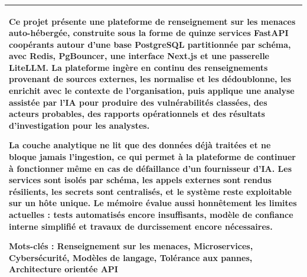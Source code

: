 \documentclass[a4paper,12pt]{report}
\begin{document}
\begin{tabular}{|p{}|}
\vspace{0.5em}
Ce projet présente une plateforme de renseignement sur les menaces auto-hébergée, construite sous la forme de quinze services FastAPI coopérants autour d'une base PostgreSQL partitionnée par schéma, avec Redis, PgBouncer, une interface Next.js et une passerelle LiteLLM. La plateforme ingère en continu des renseignements provenant de sources externes, les normalise et les dédoublonne, les enrichit avec le contexte de l'organisation, puis applique une analyse assistée par l'IA pour produire des vulnérabilités classées, des acteurs probables, des rapports opérationnels et des résultats d'investigation pour les analystes.

\vspace{0.5em}
La couche analytique ne lit que des données déjà traitées et ne bloque jamais l'ingestion, ce qui permet à la plateforme de continuer à fonctionner même en cas de défaillance d'un fournisseur d'IA. Les services sont isolés par schéma, les appels externes sont rendus résilients, les secrets sont centralisés, et le système reste exploitable sur un hôte unique. Le mémoire évalue aussi honnêtement les limites actuelles : tests automatisés encore insuffisants, modèle de confiance interne simplifié et travaux de durcissement encore nécessaires.

\vspace{0.5em}
\textbf{Mots-clés :} Renseignement sur les menaces, Microservices, Cybersécurité, Modèles de langage, Tolérance aux pannes, Architecture orientée API
\\[0.6em]
\hline
\end{tabular}

\vspace*{\fill}
\end{document}

